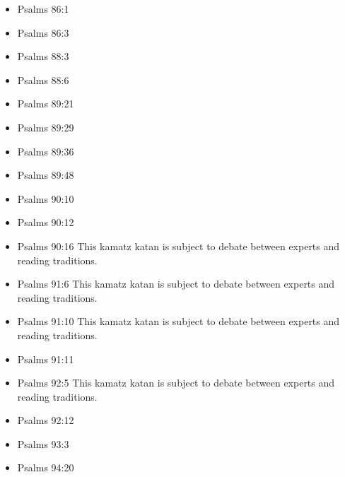 \documentclass[14pt]{article}
\begin{document}
\begin{multicols}{2}
\begin{itemize}
					\item Psalms 86:1
					
					\item Psalms 86:3
			
			\item Psalms 88:3
			
			\item Psalms 88:6
			
			\item Psalms 89:21
			
			\item Psalms 89:29
					
					\item Psalms 89:36
					
					\item Psalms 89:48
					
					\item Psalms 90:10
					
					\item Psalms 90:12
					
					\item Psalms 90:16 This kamatz katan is subject to debate between experts and reading traditions.
					
					\item Psalms 91:6 This kamatz katan is subject to debate between experts and reading traditions.
					
					\item Psalms 91:10 This kamatz katan is subject to debate between experts and reading traditions.
					
					\item Psalms 91:11
					
					\item Psalms 92:5 This kamatz katan is subject to debate between experts and reading traditions.
					
					\item Psalms 92:12
					
					\item Psalms 93:3
					
					\item Psalms 94:20
					

\end{itemize}
\end{multicols}
\end{document}
